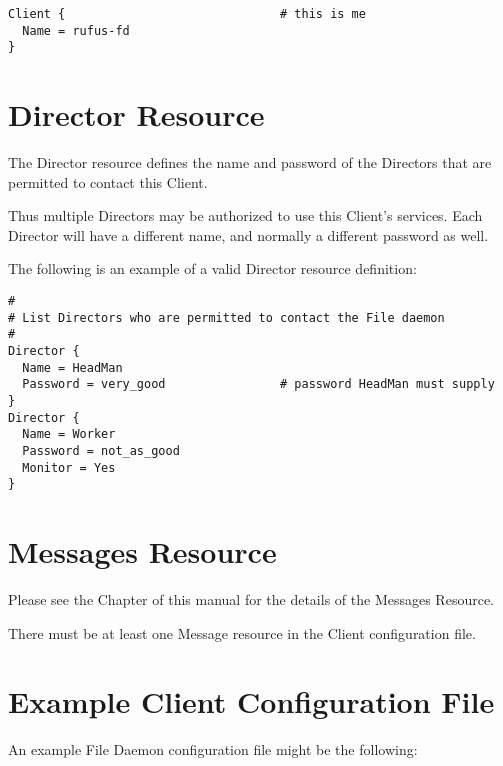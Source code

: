 \footnotesize
\begin{verbatim}
Client {                              # this is me
  Name = rufus-fd
}
\end{verbatim}
\normalsize

\section{Director Resource}
\label{ClientResourceDirector}

The Director resource defines the name and password of the Directors that are
permitted to contact this Client.





Thus multiple Directors may be authorized to use this Client's services. Each
Director will have a different name, and normally a different password as
well.

The following is an example of a valid Director resource definition:

\footnotesize
\begin{verbatim}
#
# List Directors who are permitted to contact the File daemon
#
Director {
  Name = HeadMan
  Password = very_good                # password HeadMan must supply
}
Director {
  Name = Worker
  Password = not_as_good
  Monitor = Yes
}
\end{verbatim}
\normalsize

\section{Messages Resource}
\label{MessagesResource3}

Please see the
 Chapter of this
manual for the details of the Messages Resource.

There must be at least one Message resource in the Client configuration file.

\section{Example Client Configuration File}
\label{SampleClientConfiguration}

An example File Daemon configuration file might be the following:

